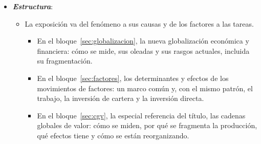 \documentclass[11pt]{article}
\begin{document}
\begin{itemize}
\item \textbf{\emph{Estructura}}:
  \begin{itemize}
  \item La exposición va del fenómeno a sus causas y de los factores a las tareas.
    \begin{itemize}
    \item En el bloque~\ref{sec:globalizacion}, la nueva globalización económica y financiera: cómo se mide, sus oleadas y sus rasgos actuales, incluida su fragmentación.
    \item En el bloque~\ref{sec:factores}, los determinantes y efectos de los movimientos de factores: un marco común y, con el mismo patrón, el trabajo, la inversión de cartera y la inversión directa.
    \item En el bloque~\ref{sec:cgv}, la especial referencia del título, las cadenas globales de valor: cómo se miden, por qué se fragmenta la producción, qué efectos tiene y cómo se están reorganizando.
    \end{itemize}
  \end{itemize}
\end{itemize}
\end{document}
